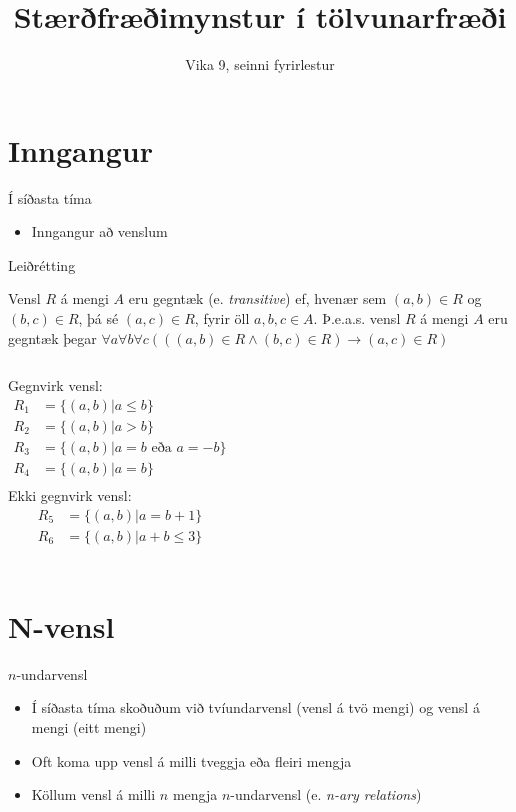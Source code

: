 \documentclass[handout]{beamer}
\title{Stærðfræðimynstur í tölvunarfræði}
\subtitle{Vika 9, seinni fyrirlestur}
\begin{document}
\begin{frame}
\titlepage
\end{frame}


\section{Inngangur}

\begin{frame}{Í síðasta tíma}
\begin{itemize}
 \item Inngangur að venslum
\end{itemize}
\end{frame}

\begin{frame}[fragile]{Leiðrétting}
\begin{tcolorbox}[title=Gegntæk vensl]
Vensl $R$ á mengi $A$ eru gegntæk (e. \emph{transitive}) ef, hvenær sem $(a, b) \in R$ og $(b, c) \in R$, þá sé $(a, c) \in R$, fyrir öll $a, b, c \in A$. Þ.e.a.s. vensl $R$ á mengi $A$ eru gegntæk þegar $\forall a\forall b\forall c(((a, b) \in R \land (b, c) \in R) \to (a, c) \in R)$
\end{tcolorbox}
\begin{columns}
Gegnvirk vensl:
\begin{align*}
R_1 &= \{(a, b)|a \leq b\}\\
R_2 &= \{(a, b)|a > b\}\\
R_3 &= \{(a, b)|a = b \text{ eða } a = -b\}\\
R_4 &= \{(a, b)|a = b\}\\
\end{align*}
Ekki gegnvirk vensl:
\begin{align*}
R_5 &= \{(a, b)|a = b+1\}\\
R_6 &= \{(a, b)|a+b \leq 3\}\\
\end{align*}
\end{columns}
\end{frame}


\section{N-vensl}

\begin{frame}{$n$-undarvensl}
\begin{itemize}
 \item Í síðasta tíma skoðuðum við tvíundarvensl (vensl á tvö mengi) og vensl á mengi (eitt mengi)
 \item Oft koma upp vensl á milli tveggja eða fleiri mengja
 \item Köllum vensl á milli $n$ mengja $n$-undarvensl (e. \emph{n-ary relations})
\end{itemize}
\end{frame}
\end{document}
